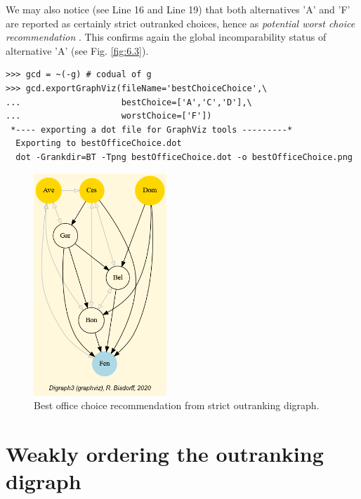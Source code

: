 We may also notice (see Line 16 and Line 19) that both alternatives 'A' and 'F' are reported as certainly strict outranked choices, hence as \emph{potential worst choice recommendation} . This confirms again the global incomparability status of alternative 'A' (see Fig. \ref{fig:6.3}).
\begin{lstlisting}
>>> gcd = ~(-g) # codual of g
>>> gcd.exportGraphViz(fileName='bestChoiceChoice',\
...                    bestChoice=['A','C','D'],\
...                    worstChoice=['F'])
 *---- exporting a dot file for GraphViz tools ---------*
  Exporting to bestOfficeChoice.dot
  dot -Grankdir=BT -Tpng bestOfficeChoice.dot -o bestOfficeChoice.png
\end{lstlisting}
\begin{figure}[h]
\sidecaption
\includegraphics[width=5cm]{Figures/bestOfficeChoice.png}
\caption{Best office choice recommendation from strict outranking digraph.}
\label{fig:6.4}       %
\end{figure}

\section{Weakly ordering the outranking digraph}
\label{sec:6.6}

